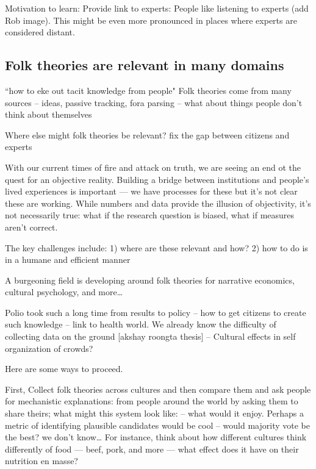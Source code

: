 {Motivation to learn: Provide link to experts}: People like listening to experts (add Rob image). This might be even more pronounced in places where experts are considered distant.


\subsection{Folk theories are relevant in many domains}
“how to eke out tacit knowledge from people"
Folk theories come from many sources -- ideas, passive tracking, fora parsing
-- what about things people don't think about themselves

Where else might folk theories be relevant?
fix the gap between citizens and experts

With our current times of fire and attack on truth, we are seeing an end ot the quest for an objective reality. Building a bridge between institutions and people’s lived experiences is important — we have processes for these but it’s not clear these are working. While numbers and data provide the illusion of objectivity, it’s not necessarily true: what if the research question is biased, what if measures aren’t correct. 

The key challenges include: 1) where are these relevant and how? 2) how to do is in a humane and efficient manner

A burgeoning field is developing around folk theories for narrative economics, cultural psychology, and more… 

Polio took such a long time from results to policy --  how to get citizens to create such knowledge -- link to health world. We already know the difficulty of collecting data on the ground [akshay roongta thesis] -- Cultural effects in self organization of crowds?

Here are some ways to proceed.

First, Collect folk theories across cultures and then compare them and ask people for mechanistic explanations: from people around the world by asking them to share theirs; what might this system look like: -- what would it enjoy. Perhaps a metric of identifying plausible candidates would be cool -- would majority vote be the best? we don't know… For instance, think about how different cultures think differently of food — beef, pork, and more — what effect does it have on their nutrition en masse?

